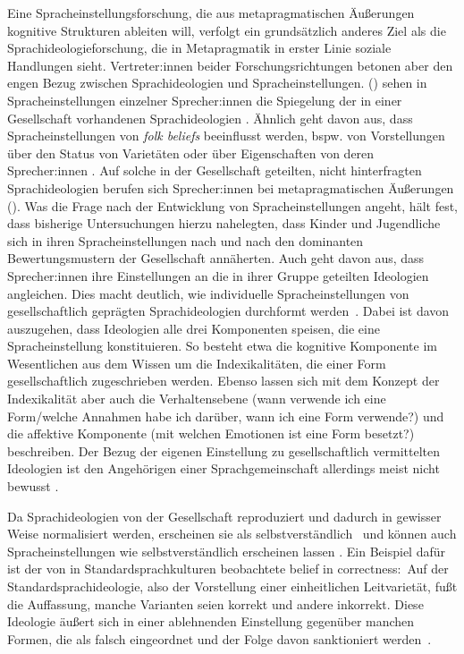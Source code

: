 Eine Spracheinstellungsforschung, die aus metapragmatischen Äußerungen kognitive Strukturen ableiten will, verfolgt ein grundsätzlich anderes Ziel als die Sprachideologieforschung, die in Metapragmatik in erster Linie soziale Handlungen sieht.
Vertreter:innen beider Forschungsrichtungen betonen aber den engen Bezug zwischen Sprachideologien und Spracheinstellungen. \citeauthor{Woolard1994} (\citeyear[61--62]{Woolard1994}) sehen in Spracheinstellungen einzelner Sprecher:innen die Spiegelung der in einer Gesellschaft vorhandenen Sprachideologien \citep[vgl. auch][161--162]{Milroy2004}. 
Ähnlich geht \citet[xxiv]{Preston.1999b} davon aus, dass Spracheinstellungen von \textit{folk beliefs} beeinflusst werden, bspw. von Vorstellungen {\"u}ber den Status von Variet{\"a}ten oder über Eigenschaften von deren Sprecher:innen \citep[ähnlich auch][34]{Garrett.2012}.  
Auf solche in der Gesellschaft geteilten, nicht hinterfragten Sprachideologien berufen sich Sprecher:innen bei metapragmatischen Äußerungen (\cites[s.][1]{Gunthner.2012}[vgl. auch][205]{Konig2015}). 
Was die Frage nach der Entwicklung von Spracheinstellungen angeht, h{\"a}lt \citet[732]{Neuland.1993} fest, dass bisherige Untersuchungen hierzu nahelegten, dass Kinder und Jugendliche sich in ihren Spracheinstellungen nach und nach den dominanten Bewertungsmustern der Gesellschaft ann{\"a}herten. 
Auch \citet[399]{Lasagabaster.2005} geht davon aus, dass Sprecher:innen ihre Einstellungen an die in ihrer Gruppe geteilten Ideologien angleichen. 
Dies macht deutlich, wie individuelle Spracheinstellungen von gesellschaftlich geprägten Sprachideologien durchformt werden~\citep[s.][732]{Neuland.1993}. 
Dabei ist davon auszugehen, dass Ideologien alle drei Komponenten speisen, die eine Spracheinstellung konstituieren. 
So besteht etwa die kognitive Komponente im Wesentlichen aus dem Wissen um die Indexikalitäten, die einer Form gesellschaftlich zugeschrieben werden. 
Ebenso lassen sich mit dem Konzept der Indexikalität aber auch die Verhaltensebene (wann verwende ich eine Form/welche Annahmen habe ich darüber, wann ich eine Form verwende?) und die affektive Komponente (mit welchen Emotionen ist eine Form besetzt?) beschreiben. 
Der Bezug der eigenen Einstellung zu gesellschaftlich vermittelten Ideologien ist den Angehörigen einer Sprachgemeinschaft allerdings meist nicht bewusst \citep[s.][133]{Milroy.2007}.

\begin{sloppypar}
Da Sprachideologien von der Gesellschaft reproduziert und dadurch in gewisser Weise normalisiert werden, erscheinen sie als selbstverst{\"a}ndlich~\citep[s.][10]{Blommaert.1999} und können auch Spracheinstellungen wie selbstverst{\"a}ndlich erscheinen lassen \citep[s.][123]{Androutsopoulos.2007}.
Ein Beispiel daf{\"u}r ist der von \citet[134]{Milroy.2007} in Standardsprachkulturen beobachtete {\glqq}belief in correctness{\grqq}:~Auf der Standardsprachideologie, also der Vorstellung einer einheitlichen Leitvariet{\"a}t, fu{\ss}t die Auffassung, manche Varianten seien korrekt und andere inkorrekt. 
Diese Ideologie {\"a}u{\ss}ert sich in einer ablehnenden Einstellung gegenüber manchen Formen, die als {\glqq}falsch{\grqq} eingeordnet und der Folge davon sanktioniert werden~\citep[134]{Milroy.2007}.
\end{sloppypar}

